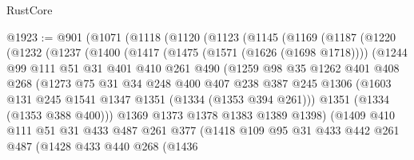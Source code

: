 \begin{lexlean}{RustCore}
\begin{coremodule}
@1923 := @901
    (@1071
      (@1118
        (@1120
          (@1123
            (@1145
              (@1169
                (@1187
                  (@1220
                    (@1232
                      (@1237
                        (@1400
                          (@1417
                            (@1475 (@1571 (@1626 (@1698 @1718))))
                            (@1244
                              @99
                              @111
                              @51
                              @31
                              @401
                              @410
                              @261
                              @490
                              (@1259
                                @98
                                @35
                                @1262
                                @401
                                @408
                                @268
                                (@1273
                                  @75
                                  @31
                                  @34
                                  @248
                                  @400
                                  @407
                                  @238
                                  @387
                                  @245
                                  @1306
                                  (@1603 @131 @245 @1541 @1347 @1351 (@1334 (@1353 @394 @261)))
                                  @1351
                                  (@1334 (@1353 @388 @400)))
                                @1369
                                @1373
                                @1378
                                @1383
                                @1389
                                @1398)
                              (@1409
                                @410
                                @111
                                @51
                                @31
                                @433
                                @487
                                @261
                                @377
                                (@1418
                                  @109
                                  @95
                                  @31
                                  @433
                                  @442
                                  @261
                                  @487
                                  (@1428
                                    @433
                                    @440
                                    @268
                                    (@1436

\end{coremodule}
\end{lexlean}
